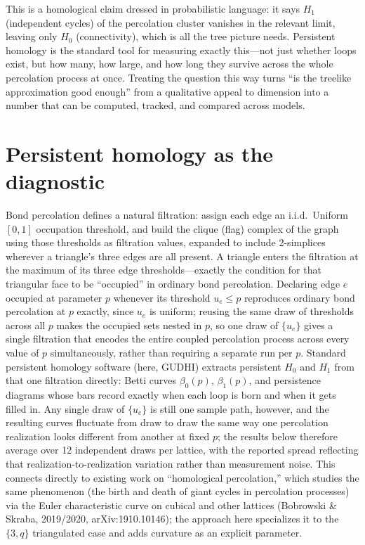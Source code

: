 \documentclass[11pt]{article}
\begin{document}
This is a homological claim dressed in probabilistic language: it says $H_1$ (independent cycles) of the percolation cluster vanishes in the relevant limit, leaving only $H_0$ (connectivity), which is all the tree picture needs. Persistent homology is the standard tool for measuring exactly this---not just whether loops exist, but how many, how large, and how long they survive across the whole percolation process at once. Treating the question this way turns ``is the treelike approximation good enough'' from a qualitative appeal to dimension into a number that can be computed, tracked, and compared across models.

\section{Persistent homology as the diagnostic}

Bond percolation defines a natural filtration: assign each edge an i.i.d.\ Uniform$[0,1]$ occupation threshold, and build the clique (flag) complex of the graph using those thresholds as filtration values, expanded to include 2-simplices wherever a triangle's three edges are all present. A triangle enters the filtration at the maximum of its three edge thresholds---exactly the condition for that triangular face to be ``occupied'' in ordinary bond percolation. Declaring edge $e$ occupied at parameter $p$ whenever its threshold $u_e \le p$ reproduces ordinary bond percolation at $p$ exactly, since $u_e$ is uniform; reusing the same draw of thresholds across all $p$ makes the occupied sets nested in $p$, so one draw of $\{u_e\}$ gives a single filtration that encodes the entire coupled percolation process across every value of $p$ simultaneously, rather than requiring a separate run per $p$. Standard persistent homology software (here, GUDHI) extracts persistent $H_0$ and $H_1$ from that one filtration directly: Betti curves $\beta_0(p)$, $\beta_1(p)$, and persistence diagrams whose bars record exactly when each loop is born and when it gets filled in. Any single draw of $\{u_e\}$ is still one sample path, however, and the resulting curves fluctuate from draw to draw the same way one percolation realization looks different from another at fixed $p$; the results below therefore average over 12 independent draws per lattice, with the reported spread reflecting that realization-to-realization variation rather than measurement noise. This connects directly to existing work on ``homological percolation,'' which studies the same phenomenon (the birth and death of giant cycles in percolation processes) via the Euler characteristic curve on cubical and other lattices (Bobrowski \& Skraba, 2019/2020, arXiv:1910.10146); the approach here specializes it to the $\{3,q\}$ triangulated case and adds curvature as an explicit parameter.
\end{document}
